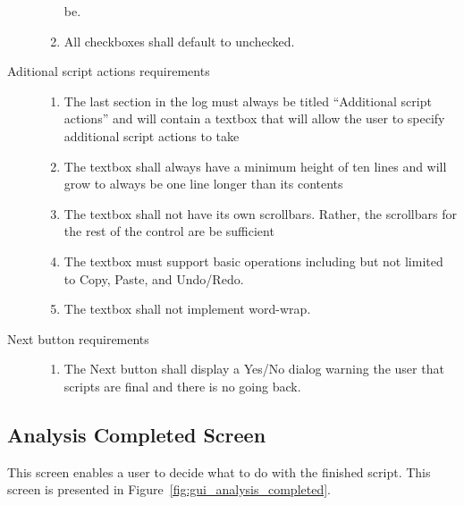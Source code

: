 \begin{description}
\begin{enumerate}
  be.
  \item All checkboxes shall default to unchecked.
\end{enumerate}
\item[Aditional script actions requirements] \hfill
\begin{enumerate}
  \item The last section in the log must always be titled ``Additional script
  actions'' and will contain a textbox that will allow the user to specify
  additional script actions to take
  \item The textbox shall always have a minimum height of ten lines and will
  grow to always be one line longer than its contents
  \item The textbox shall not have its own scrollbars.  Rather, the scrollbars
  for the rest of the control are be sufficient
  \item The textbox must support basic operations including but not limited
  to Copy, Paste, and Undo/Redo.
  \item The textbox shall not implement word-wrap.
\end{enumerate}
\item[Next button requirements] \hfill
\begin{enumerate}
  \item The Next button shall display a Yes/No dialog warning the user that
  scripts are final and there is no going back.
\end{enumerate}
\end{description}

\subsection{Analysis Completed Screen}
This screen enables a user to decide what to do with the finished script.  This
screen is presented in Figure~\ref{fig:gui_analysis_completed}.

